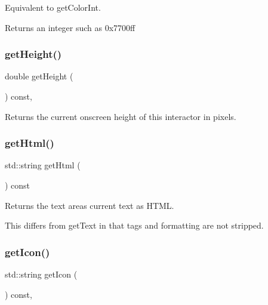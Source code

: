 Equivalent to get\+Color\+Int. \begin{DoxyReturn}{Returns}
an integer such as 0x7700ff 
\end{DoxyReturn}
\mbox{\label{classGInteractor_a1e7e353362434072875264cf95629f99}} 
\subsubsection{\texorpdfstring{get\+Height()}{getHeight()}}
{\footnotesize\ttfamily double get\+Height (\begin{DoxyParamCaption}{ }\end{DoxyParamCaption}) const\hspace{0.3cm}{\ttfamily [virtual]}, {\ttfamily [inherited]}}



Returns the current onscreen height of this interactor in pixels. 

\mbox{\label{classGTextArea_a58d3b7767e049484e3d7507379e6ecc7}} 
\subsubsection{\texorpdfstring{get\+Html()}{getHtml()}}
{\footnotesize\ttfamily std\+::string get\+Html (\begin{DoxyParamCaption}{ }\end{DoxyParamCaption}) const\hspace{0.3cm}{\ttfamily [virtual]}}



Returns the text area\textquotesingle{}s current text as H\+T\+ML. 

This differs from get\+Text in that tags and formatting are not stripped. \mbox{\label{classGInteractor_aaed62a73004939a64da6f0eb9eb64d73}} 
\subsubsection{\texorpdfstring{get\+Icon()}{getIcon()}}
{\footnotesize\ttfamily std\+::string get\+Icon (\begin{DoxyParamCaption}{ }\end{DoxyParamCaption}) const\hspace{0.3cm}{\ttfamily [virtual]}, {\ttfamily [inherited]}}



